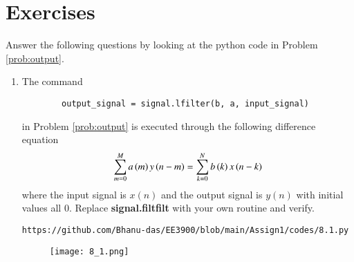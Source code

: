 \documentclass[journal,12pt,twocolumn]{IEEEtran}
\renewcommand\thesection{\arabic{section}}
\begin{document}
\section{Exercises}
Answer the following questions by looking at the python code in Problem \ref{prob:output}.
\begin{enumerate}[label=\thesection.\arabic*]
	\item
	The command
	\begin{lstlisting}
		output_signal = signal.lfilter(b, a, input_signal)
	\end{lstlisting}
	in Problem \ref{prob:output} is executed through the following difference equation
	\begin{equation}
		\label{eq:iir_filter_gen}
		\sum _{m=0}^{M}a\left(m\right)y\left(n-m\right)=\sum _{k=0}^{N}b\left(k\right)x\left(n-k\right)
	\end{equation}
	where the input signal is $x(n)$ and the output signal is $y(n)$ with initial values all 0. Replace
	\textbf{signal.filtfilt} with your own routine and verify.
	\solution 
	\begin{lstlisting}
https://github.com/Bhanu-das/EE3900/blob/main/Assign1/codes/8.1.py
	\end{lstlisting}
	\begin{figure}[!ht]
\centering
\texttt{[image: 8\_1.png]}
\caption{}
\label{fig:8_1}
\end{figure}
	

\end{enumerate}
\end{document}
